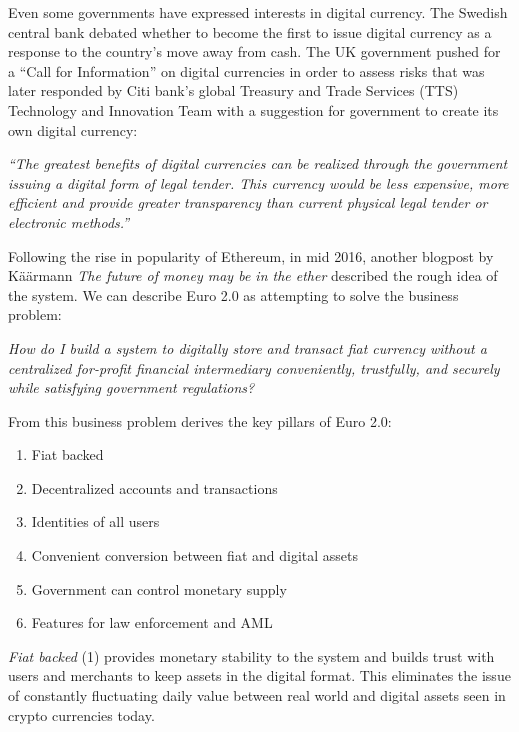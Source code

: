 \documentclass[a4paper,12pt]{article} %
\begin{document}
{{Even some governments have expressed interests in digital currency. The Swedish central bank debated whether to become the first to issue digital currency as a response to the country's move away from cash\cite{milne2016sweden}. The UK government pushed for a ``Call for Information'' on digital currencies in order to assess risks\cite{nermin2014ukcall} that was later responded by Citi bank's global Treasury and Trade Services (TTS) Technology and Innovation Team with a suggestion for government to create its own digital currency\cite{spaven2015ukcurrency}:

\begin{quoting}
	\textit{``The greatest benefits of digital currencies can be realized through the government issuing a digital form of legal tender. This currency would be less expensive, more efficient and provide greater transparency than current physical legal tender or electronic methods.''}
\end{quoting}

Following the rise in popularity of Ethereum, in mid 2016, another blogpost by Käärmann \textit{The future of money may be in the ether}\cite{kaarmann2016ether} described the rough idea of the system. We can describe Euro 2.0 as attempting to solve the business problem:

\begin{quoting}
	\textit{How do I build a system to digitally store and transact fiat currency without a centralized for-profit financial intermediary conveniently, trustfully, and securely while satisfying government regulations?}
\end{quoting}

From this business problem derives the key pillars of Euro 2.0:

\begin{enumerate}
	\item Fiat backed
	\item Decentralized accounts and transactions
	\item Identities of all users
	\item Convenient conversion between fiat and digital assets
	\item Government can control monetary supply
	\item Features for law enforcement and AML
\end{enumerate}

\textit{Fiat backed} (1) provides monetary stability to the system and builds trust with users and merchants to keep assets in the digital format. This eliminates the issue of constantly fluctuating daily value between real world and digital assets seen in crypto currencies today.

}}
\end{document}
